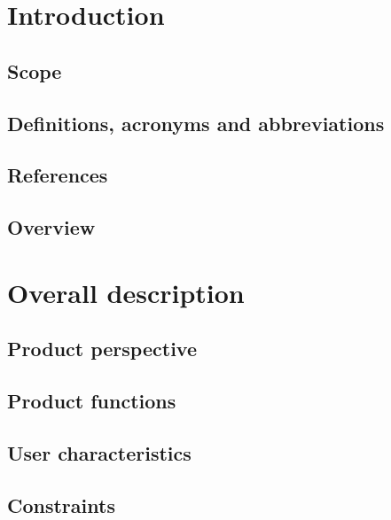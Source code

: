 \documentclass{../Common/Structure/doc_pdf}
\begin{document}
\titleToc

\chapter{Introduction}



\section{Scope}


\section{Definitions, acronyms and abbreviations}


\section{References}


\section{Overview}


\chapter{Overall description}

\section{Product perspective}


\section{Product functions}


\section{User characteristics}

\section{Constraints}

\end{document}
